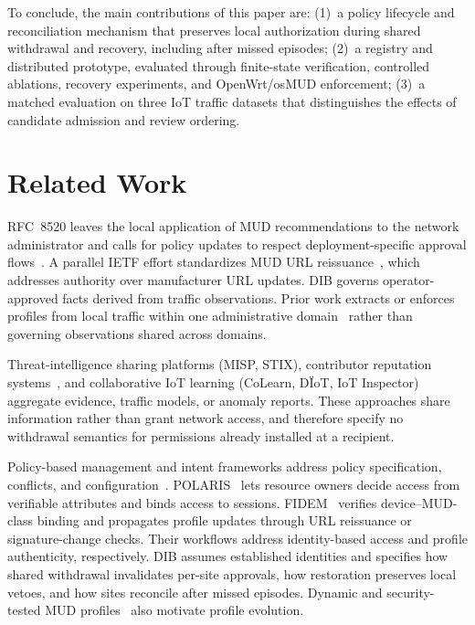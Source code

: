 \documentclass[journal]{IEEEtran}
\theoremstyle{definition}
\begin{document}
To conclude, the main contributions of this paper are:
(1)~a policy lifecycle and reconciliation mechanism that preserves local authorization during shared withdrawal and recovery, including after missed episodes;
(2)~a registry and distributed prototype, evaluated through finite-state verification, controlled ablations, recovery experiments, and OpenWrt/osMUD enforcement;
(3)~a matched evaluation on three IoT traffic datasets that distinguishes the effects of candidate admission and review ordering.


\section{Related Work}
\label{sec:related-work}

RFC~8520 leaves the local application of MUD recommendations to the network administrator and calls for policy updates to respect deployment-specific approval flows~\cite[Secs.~1.1 and~1.8]{rfc8520}. A parallel IETF effort standardizes MUD URL reissuance~\cite{mudacceptableurls}, which addresses authority over manufacturer URL updates. DIB governs operator-approved facts derived from traffic observations. Prior work extracts or enforces profiles from local traffic within one administrative domain~\cite{clearasmud, hamzatdsc, mudflow, CornoMannella2023GatewayMUD, osmud, mudscope} rather than governing observations shared across domains.

Threat-intelligence sharing platforms (MISP, STIX), contributor reputation systems~\cite{wagner2016misp, stix21, eigentrust, trustsurvey}, and collaborative IoT learning (CoLearn, D\"IoT, IoT Inspector)~\cite{colearn,ndiot2019, iotinspector, vasilomanolakis2015collaborative} aggregate evidence, traffic models, or anomaly reports. These approaches share information rather than grant network access, and therefore specify no withdrawal semantics for permissions already installed at a recipient.

Policy-based management and intent frameworks address policy specification, conflicts, and configuration~\cite{pbnm,rfc9315,alshaer2004firewall,chowdhary2022intent,pipeconf2022,vergutz2023data}. POLARIS~\cite{polaris} lets resource owners decide access from verifiable attributes and binds access to sessions. FIDEM~\cite{fidem} verifies device--MUD-class binding and propagates profile updates through URL reissuance or signature-change checks. Their workflows address identity-based access and profile authenticity, respectively. DIB assumes established identities and specifies how shared withdrawal invalidates per-site approvals, how restoration preserves local vetoes, and how sites reconcile after missed episodes. Dynamic and security-tested MUD profiles~\cite{blockchainmud,matheu2019mudtesting} also motivate profile evolution.
\end{document}
